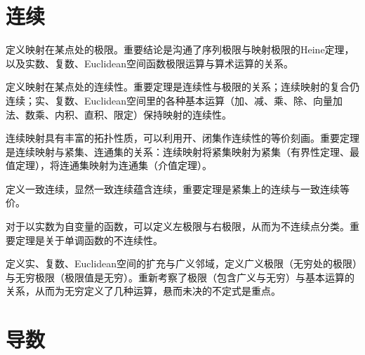 \documentclass{tufte-book}
\begin{document}
\chapter{连续}
\par 定义映射在某点处的极限。重要结论是沟通了序列极限与映射极限的Heine定理，以及实数、复数、Euclidean空间函数极限运算与算术运算的关系。
\par 定义映射在某点处的连续性。重要定理是连续性与极限的关系；连续映射的复合仍连续；实、复数、Euclidean空间里的各种基本运算（加、减、乘、除、向量加法、数乘、内积、直积、限定）保持映射的连续性。
\par 连续映射具有丰富的拓扑性质，可以利用开、闭集作连续性的等价刻画。重要定理是连续映射与紧集、连通集的关系：连续映射将紧集映射为紧集（有界性定理、最值定理），将连通集映射为连通集（介值定理）。
\par 定义一致连续，显然一致连续蕴含连续，重要定理是紧集上的连续与一致连续等价。
\par 对于以实数为自变量的函数，可以定义左极限与右极限，从而为不连续点分类。重要定理是关于单调函数的不连续性。
\par 定义实、复数、Euclidean空间的扩充与广义邻域，定义广义极限（无穷处的极限）与无穷极限（极限值是无穷）。重新考察了极限（包含广义与无穷）与基本运算的关系，从而为无穷定义了几种运算，悬而未决的不定式是重点。

\chapter{导数}
\end{document}
